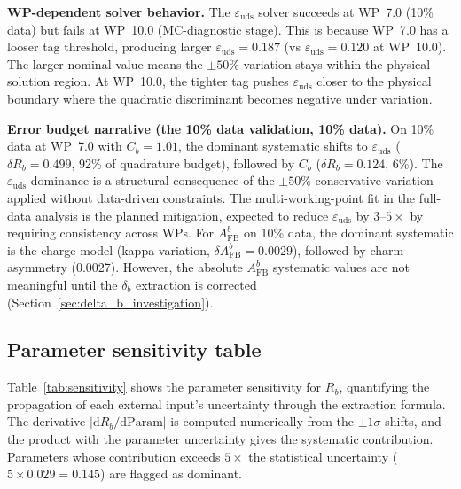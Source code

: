 \documentclass[11pt,a4paper]{article}
\begin{document}
\textbf{WP-dependent solver behavior.} The $\varepsilon_\mathrm{uds}$ solver succeeds
at WP~7.0 (10\% data) but fails at WP~10.0 (MC-diagnostic stage). This is because WP~7.0
has a looser tag threshold, producing larger $\varepsilon_\mathrm{uds} = 0.187$ (vs
$\varepsilon_\mathrm{uds} = 0.120$ at WP~10.0). The larger nominal value means the
$\pm 50\%$ variation stays within the physical solution region. At WP~10.0, the tighter
tag pushes $\varepsilon_\mathrm{uds}$ closer to the physical boundary where the
quadratic discriminant becomes negative under variation.

\textbf{Error budget narrative (the 10\% data validation, 10\% data).} On 10\% data at WP~7.0
with $C_b = 1.01$, the dominant systematic shifts to $\varepsilon_\mathrm{uds}$
($\delta R_b = 0.499$, 92\% of quadrature budget), followed by $C_b$ ($\delta R_b = 0.124$, 6\%).
The $\varepsilon_\mathrm{uds}$ dominance is a structural consequence of the
$\pm 50\%$ conservative variation applied without data-driven constraints. The
multi-working-point fit in the full-data analysis is the planned mitigation, expected to reduce
$\varepsilon_\mathrm{uds}$ by $3$--$5\times$ by requiring consistency across WPs.
For $A_\mathrm{FB}^b$ on 10\% data, the dominant systematic is the charge model
(kappa variation, $\delta A_\mathrm{FB}^b = 0.0029$), followed by charm asymmetry
(0.0027). However, the absolute $A_\mathrm{FB}^b$ systematic values are not
meaningful until the $\delta_b$ extraction is corrected
(Section~\ref{sec:delta_b_investigation}).

\subsection{Parameter sensitivity table}
\label{sec:sensitivity}

Table~\ref{tab:sensitivity} shows the parameter sensitivity for $R_b$,
quantifying the propagation of each external input's uncertainty through the
extraction formula. The derivative $|\mathrm{d}R_b/\mathrm{d}\mathrm{Param}|$ is
computed numerically from the $\pm 1\sigma$ shifts, and the product with the
parameter uncertainty gives the systematic contribution. Parameters whose
contribution exceeds $5\times$ the statistical uncertainty ($5 \times 0.029 = 0.145$)
are flagged as dominant.
\end{document}
